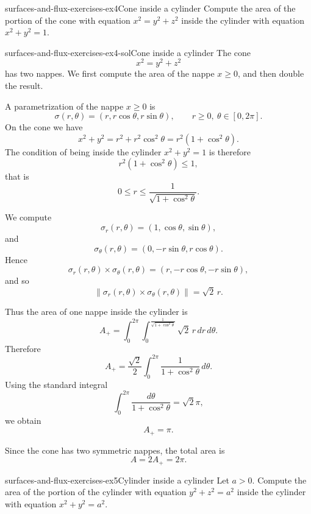 \documentclass[preview]{standalone}
\begin{document}
\begin{snippetexercise}{surfaces-and-flux-exercises-ex4}{Cone inside a cylinder}
    Compute the area of the portion of the cone with equation \(x^2=y^2+z^2\) inside the cylinder with equation \(x^2+y^2=1\).
\end{snippetexercise}

\begin{snippetsolution}{surfaces-and-flux-exercises-ex4-sol}{Cone inside a cylinder}
    The cone
    \[
        x^2=y^2+z^2
    \]
    has two nappes. We first compute the area of the nappe \(x\geq 0\), and then double the result.

    A parametrization of the nappe \(x\geq 0\) is
    \[
        \sigma(r,\theta)=(r,r\cos\theta,r\sin\theta),
        \qquad r\geq 0,\ \theta\in[0,2\pi].
    \]
    On the cone we have
    \[
        x^2+y^2=r^2+r^2\cos^2\theta
        =
        r^2(1+\cos^2\theta).
    \]
    The condition of being inside the cylinder \(x^2+y^2=1\) is therefore
    \[
        r^2(1+\cos^2\theta)\leq 1,
    \]
    that is
    \[
        0\leq r\leq \frac{1}{\sqrt{1+\cos^2\theta}}.
    \]

    We compute
    \[
        \sigma_r(r,\theta)=(1,\cos\theta,\sin\theta),
    \]
    and
    \[
        \sigma_\theta(r,\theta)=(0,-r\sin\theta,r\cos\theta).
    \]
    Hence
    \[
        \sigma_r(r,\theta)\times\sigma_\theta(r,\theta)
        =
        (r,-r\cos\theta,-r\sin\theta),
    \]
    and so
    \[
        \|\sigma_r(r,\theta)\times\sigma_\theta(r,\theta)\|
        =
        \sqrt{2}\,r.
    \]

    Thus the area of one nappe inside the cylinder is
    \[
        A_+
        =
        \int_0^{2\pi}
        \int_0^{\frac{1}{\sqrt{1+\cos^2\theta}}}
        \sqrt{2}\,r\,dr\,d\theta.
    \]
    Therefore
    \[
        A_+
        =
        \frac{\sqrt{2}}{2}
        \int_0^{2\pi}
        \frac{1}{1+\cos^2\theta}
        \,d\theta.
    \]
    Using the standard integral
    \[
        \int_0^{2\pi}\frac{d\theta}{1+\cos^2\theta}
        =
        \sqrt{2}\pi,
    \]
    we obtain
    \[
        A_+=\pi.
    \]

    Since the cone has two symmetric nappes, the total area is
    \[
        A=2A_+=2\pi.
    \]
\end{snippetsolution}

\begin{snippetexercise}{surfaces-and-flux-exercises-ex5}{Cylinder inside a cylinder}
    Let \(a>0\). Compute the area of the portion of the cylinder with equation \(y^2+z^2=a^2\) inside the cylinder with equation \(x^2+y^2=a^2\).
\end{snippetexercise}
\end{document}
